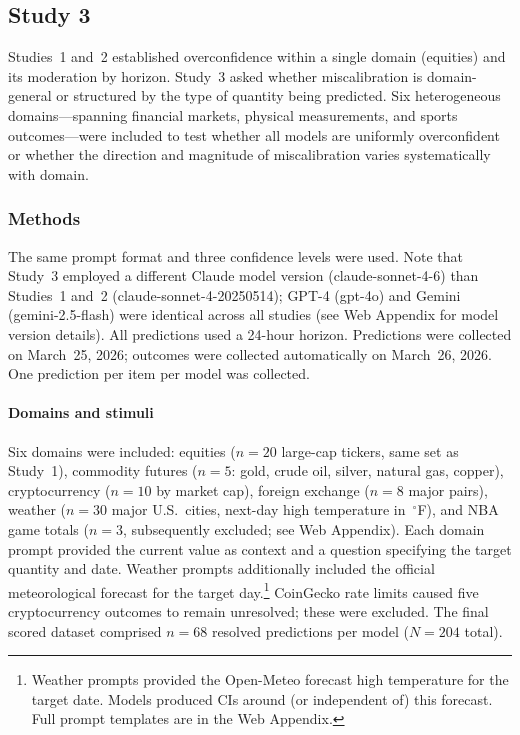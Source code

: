 
\subsection*{Study 3}

Studies~1 and~2 established overconfidence within a single domain (equities)
and its moderation by horizon. Study~3 asked whether miscalibration is
domain-general or structured by the type of quantity being predicted. Six
heterogeneous domains---spanning financial markets, physical measurements,
and sports outcomes---were included to test whether all models are uniformly
overconfident or whether the direction and magnitude of miscalibration
varies systematically with domain.

\subsubsection*{Methods}

The same prompt format and three confidence levels were used. Note that
Study~3 employed a different Claude model version (claude-sonnet-4-6)
than Studies~1 and~2 (claude-sonnet-4-20250514); GPT-4 (gpt-4o) and
Gemini (gemini-2.5-flash) were identical across all studies (see
Web Appendix for model version details). All predictions used a 24-hour
horizon. Predictions were collected on March~25, 2026; outcomes were
collected automatically on March~26, 2026. One prediction per item per
model was collected.

\paragraph{Domains and stimuli} Six domains were included: equities
($n = 20$ large-cap tickers, same set as Study~1), commodity futures
($n = 5$: gold, crude oil, silver, natural gas, copper), cryptocurrency
($n = 10$ by market cap), foreign exchange ($n = 8$ major pairs), weather
($n = 30$ major U.S.\ cities, next-day high temperature in~$^\circ$F), and
NBA game totals ($n = 3$, subsequently excluded; see Web Appendix). Each
domain prompt provided the current value as context and a question
specifying the target quantity and date. Weather prompts additionally
included the official meteorological forecast for the target day.\footnote{%
  Weather prompts provided the Open-Meteo forecast high temperature for the
  target date. Models produced CIs around (or independent of) this forecast.
  Full prompt templates are in the Web Appendix.}
CoinGecko rate limits caused five cryptocurrency outcomes to remain
unresolved; these were excluded. The final scored dataset comprised
$n = 68$ resolved predictions per model ($N = 204$ total).


